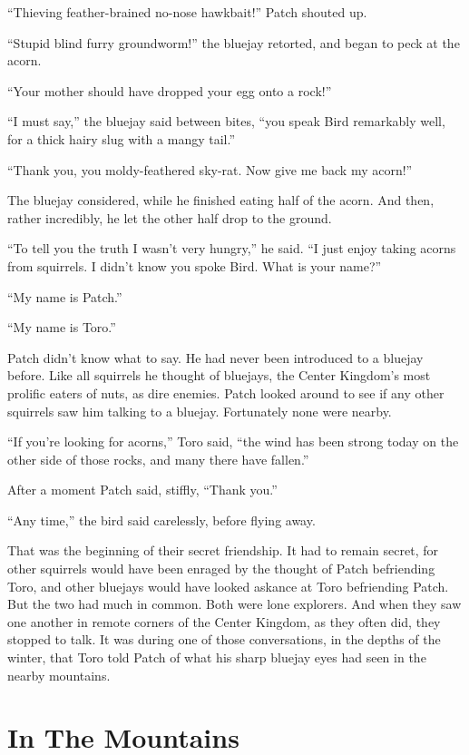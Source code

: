 \documentclass[12pt]{memoir}
\begin{document}
“Thieving feather-brained no-nose hawkbait!” Patch shouted up.

“Stupid blind furry groundworm!” the bluejay retorted, and began to
peck at the acorn.

“Your mother should have dropped your egg onto a rock!”

“I must say,” the bluejay said between bites, “you speak Bird
remarkably well, for a thick hairy slug with a mangy tail.”

“Thank you, you moldy-feathered sky-rat. Now give me back my acorn!”

The bluejay considered, while he finished eating half of the
acorn. And then, rather incredibly, he let the other half drop to the
ground.

“To tell you the truth I wasn’t very hungry,” he said. “I just enjoy
taking acorns from squirrels. I didn’t know you spoke Bird. What is
your name?”

“My name is Patch.”

“My name is Toro.”

Patch didn’t know what to say. He had never been introduced to a
bluejay before. Like all squirrels he thought of bluejays, the Center
Kingdom’s most prolific eaters of nuts, as dire enemies. Patch looked
around to see if any other squirrels saw him talking to a
bluejay. Fortunately none were nearby.

“If you’re looking for acorns,” Toro said, “the wind has been strong
today on the other side of those rocks, and many there have fallen.”

After a moment Patch said, stiffly, “Thank you.”

“Any time,” the bird said carelessly, before flying away.

That was the beginning of their secret friendship. It had to remain
secret, for other squirrels would have been enraged by the thought of
Patch befriending Toro, and other bluejays would have looked askance
at Toro befriending Patch. But the two had much in common. Both were
lone explorers. And when they saw one another in remote corners of the
Center Kingdom, as they often did, they stopped to talk. It was during
one of those conversations, in the depths of the winter, that Toro
told Patch of what his sharp bluejay eyes had seen in the nearby
mountains.


\section{In The Mountains}
\end{document}
